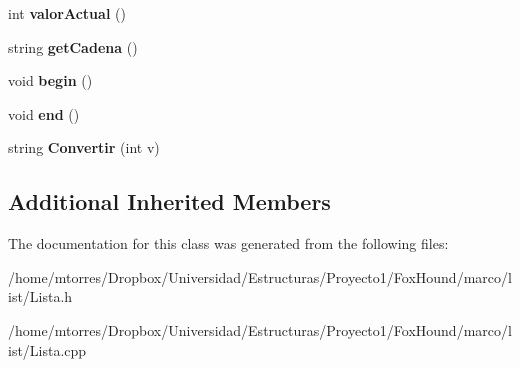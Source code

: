 \begin{DoxyCompactItemize}
\item 
\hypertarget{class_lista_a7e0b1c54b8a0e883d8f84a0a5a01a6e0}{int {\bfseries valor\-Actual} ()}\label{class_lista_a7e0b1c54b8a0e883d8f84a0a5a01a6e0}

\item 
\hypertarget{class_lista_afc38502d4f7f4f61eb4c32a660500cfe}{string {\bfseries get\-Cadena} ()}\label{class_lista_afc38502d4f7f4f61eb4c32a660500cfe}

\item 
\hypertarget{class_lista_a31b17287e4f3637f57960284663a8d2c}{void {\bfseries begin} ()}\label{class_lista_a31b17287e4f3637f57960284663a8d2c}

\item 
\hypertarget{class_lista_a3b40035b6c22ec86f54f7a6c246d576c}{void {\bfseries end} ()}\label{class_lista_a3b40035b6c22ec86f54f7a6c246d576c}

\item 
\hypertarget{class_lista_a694474c353959d9cb63440c7d74d6f8e}{string {\bfseries Convertir} (int v)}\label{class_lista_a694474c353959d9cb63440c7d74d6f8e}

\end{DoxyCompactItemize}
\subsection*{Additional Inherited Members}


The documentation for this class was generated from the following files\-:\begin{DoxyCompactItemize}
\item 
/home/mtorres/\-Dropbox/\-Universidad/\-Estructuras/\-Proyecto1/\-Fox\-Hound/marco/list/Lista.\-h\item 
/home/mtorres/\-Dropbox/\-Universidad/\-Estructuras/\-Proyecto1/\-Fox\-Hound/marco/list/Lista.\-cpp\end{DoxyCompactItemize}
